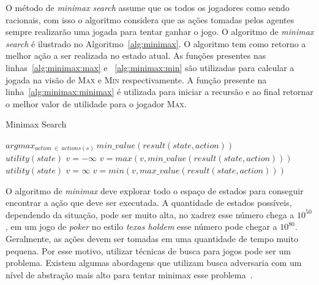 O método de \textit{minimax search} assume que os todos os jogadores como sendo racionais, com isso o algoritmo considera que as ações tomadas pelos agentes sempre realizarão uma jogada para tentar ganhar o jogo.
O algoritmo de \textit{minimax search} é ilustrado no Algoritmo~\ref{alg:minimax}. 
O algoritmo tem como retorno a melhor ação a ser realizada no estado atual. 
As funções presentes nas linhas~\ref{alg:minimax:max} e ~\ref{alg:minimax:min} são utilizadas para calcular a jogada na visão de \textsc{Max} e \textsc{Min} respectivamente.
A função presente na linha~\ref{alg:minimax:minimax} é utilizada para iniciar a recursão e ao final retornar o melhor valor de utilidade para o jogador \textsc{Max}.

\begin{algorithm}
	\caption{Minimax Search}
	\label{alg:minimax}
	\begin{algorithmic}[1]	
		 \label{alg:minimax:minimax}
		\State \Return $arg max_{action~ \in~ actions(s)}~ min\_value(result(state,  action)) $
		\EndFunction \\
		\label{alg:minimax:max}
		\State	\Return $utility(state)$
		\EndIf
		\State $v = -\infty$
		\State $v = max(v, min\_value(result(state,action)))$
		\EndFor	
		\EndFunction \\
		\label{alg:minimax:min}
		\State	\Return $utility(state)$
		\EndIf
		\State $v = \infty$
		\State $v = min(v, max\_value(result(state,action)))$
		\EndFor	
		\EndFunction
	\end{algorithmic}
\end{algorithm}


O algoritmo de \textit{minimax} deve explorar todo o espaço de estados para conseguir encontrar a ação que deve ser executada. 
A quantidade de estados possíveis, dependendo da situação, pode ser muito alta, no xadrez esse número chega a $10^{50}$, em um jogo de \textit{poker} no estilo \textit{texas holdem} esse número pode chegar a $10^{80}$. 
Geralmente, as ações devem ser tomadas em uma quantidade de tempo muito pequena. 
Por esse motivo, utilizar técnicas de busca para jogos pode ser um problema. 
Existem algumas abordagens que utilizam busca adversaria com um nível de abstração mais alto para tentar minimax esse problema~\cite{ontanon2013survey}. 
